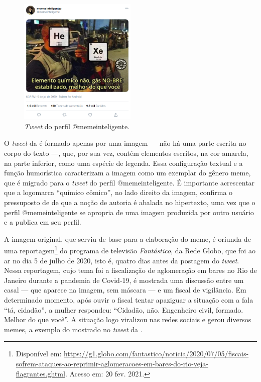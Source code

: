 \documentclass{textolivre}
\begin{document}
\begin{figure}[htbp]
 \centering
 \includegraphics[width=0.5\textwidth]{Fig2.png}
 \caption{\textit{Tweet} do perfil @memeinteligente.}
 \label{fig02}
\end{figure}

O \textit{tweet} da  é formado apenas por uma imagem — não há uma parte escrita no corpo do texto —, que, por sua vez, contém elementos escritos, na cor amarela, na parte inferior, como uma espécie de legenda. Essa configuração textual e a função humorística caracterizam a imagem como um exemplar do gênero meme, que é migrado para o \textit{tweet} do perfil @memeinteligente. É importante acrescentar que a logomarca “químico cômico”, no lado direito da imagem, confirma o pressuposto de \textcite{xavier_desafio_2015} de que a noção de autoria é abalada no hipertexto, uma vez que o perfil @memeinteligente se apropria de uma imagem produzida por outro usuário e a publica em seu perfil.

A imagem original, que serviu de base para a elaboração do meme, é oriunda de uma reportagem\footnote{Disponível em: \url{https://g1.globo.com/fantastico/noticia/2020/07/05/fiscais-sofrem-ataques-ao-reprimir-aglomeracoes-em-bares-do-rio-veja-flagrantes.ghtml}. Acesso em: 20 fev. 2021.} do programa de televisão \textit{Fantástico}, da Rede Globo, que foi ao ar no dia 5 de julho de 2020, isto é, quatro dias antes da postagem do \textit{tweet}. Nessa reportagem, cujo tema foi a fiscalização de aglomeração em bares no Rio de Janeiro durante a pandemia de Covid-19, é mostrada uma discussão entre um casal — que aparece na imagem, sem máscara — e um fiscal de vigilância. Em determinado momento, após ouvir o fiscal tentar apaziguar a situação com a fala “tá, cidadão”, a mulher respondeu: “Cidadão, não. Engenheiro civil, formado. Melhor do que você”. A situação logo viralizou nas redes sociais e gerou diversos memes, a exemplo do mostrado no \textit{tweet} da .
\end{document}
